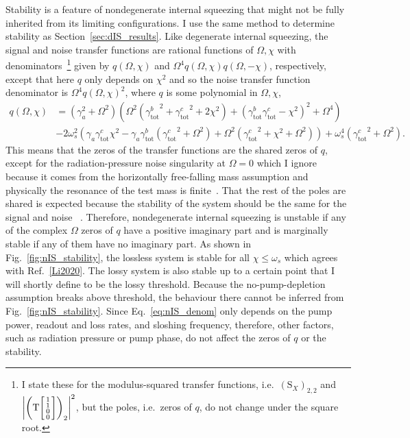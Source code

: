 Stability is a feature of nondegenerate internal squeezing that might not be fully inherited from its limiting configurations. I use the same method to determine stability as Section~\ref{sec:dIS_results}. Like degenerate internal squeezing, the signal and noise transfer functions are rational functions of $\Omega, \chi$ with denominators~\footnote{I state these for the modulus-squared transfer functions, i.e.\ $(\text{S}_X)_{2,2}$ and $\abs{\left(\text{T}\begin{bsmallmatrix}1 \\1\\0\\0\end{bsmallmatrix}\right)_2}^2$, but the poles, i.e.\ zeros of $q$, do not change under the square root.} given by $q(\Omega,\chi)$ and $\Omega^4 q(\Omega,\chi) q(\Omega,-\chi)$, respectively, except that here $q$ only depends on $\chi^2$ and so the noise transfer function denominator is $\Omega^4 q(\Omega,\chi)^2$, where $q$ is some polynomial in $\Omega, \chi$, 
\begin{align}\label{eq:nIS_denom}
q(\Omega,\chi)&=\left(\gamma_a^2+\Omega ^2\right) \left(\Omega ^2 \left({\gamma^b_\text{tot}}^2+{\gamma^c_\text{tot}}^2+2 \chi ^2\right)+\left({\gamma^b_\text{tot}} {\gamma^c_\text{tot}}-\chi ^2\right)^2+\Omega ^4\right)\\
&-2 \omega_s^2 \left(\gamma_a {\gamma^c_\text{tot}} \chi ^2-\gamma_a {\gamma^b_\text{tot}} \left({\gamma^c_\text{tot}}^2+\Omega ^2\right)+\Omega ^2 \left({\gamma^c_\text{tot}}^2+\chi ^2+\Omega ^2\right)\right)+\omega_s^4 \left({\gamma^c_\text{tot}}^2+\Omega ^2\right).
\end{align}
This means that the zeros of the transfer functions are the shared zeros of $q$, except for the radiation-pressure noise singularity at $\Omega=0$ which I ignore because it comes from the horizontally free-falling mass assumption and physically the resonance of the test mass is finite~\cite{}. That the rest of the poles are shared is expected because the stability of the system should be the same for the signal and noise ~\cite{}.
Therefore, nondegenerate internal squeezing is unstable if any of the complex $\Omega$ zeros of $q$ have a positive imaginary part and is marginally stable if any of them have no imaginary part. As shown in Fig.~\ref{fig:nIS_stability}, the lossless system is stable for all $\chi\leq\omega_s$ which agrees with Ref.~\ref{Li2020}. The lossy system is also stable up to a certain point that I will shortly define to be the lossy threshold. Because the no-pump-depletion assumption breaks above threshold, the behaviour there cannot be inferred from Fig.~\ref{fig:nIS_stability}.
Since Eq.~\ref{eq:nIS_denom} only depends on the pump power, readout and loss rates, and sloshing frequency, therefore, other factors, such as radiation pressure or pump phase, do not affect the zeros of $q$ or the stability.

